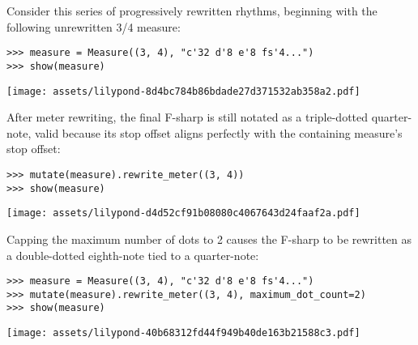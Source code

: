 Consider this series of progressively rewritten rhythms, beginning with the
following unrewritten 3/4 measure:

\begin{comment}
<abjad>
measure = Measure((3, 4), "c'32 d'8 e'8 fs'4...")
show(measure)
</abjad>
\end{comment}

\begin{singlespacing}
\vspace{-0.5\baselineskip}
\begin{lstlisting}
>>> measure = Measure((3, 4), "c'32 d'8 e'8 fs'4...")
>>> show(measure)
\end{lstlisting}
\noindent\texttt{[image: assets/lilypond-8d4bc784b86bdade27d371532ab358a2.pdf]}
\end{singlespacing}

\noindent After meter rewriting, the final F-sharp is still notated as a
triple-dotted quarter-note, valid because its stop offset aligns perfectly with
the containing measure's stop offset:

\begin{comment}
<abjad>
mutate(measure).rewrite_meter((3, 4))
show(measure)
</abjad>
\end{comment}

\begin{singlespacing}
\vspace{-0.5\baselineskip}
\begin{lstlisting}
>>> mutate(measure).rewrite_meter((3, 4))
>>> show(measure)
\end{lstlisting}
\noindent\texttt{[image: assets/lilypond-d4d52cf91b08080c4067643d24faaf2a.pdf]}
\end{singlespacing}

\noindent Capping the maximum number of dots to 2 causes the F-sharp to be
rewritten as a double-dotted eighth-note tied to a quarter-note:

\begin{comment}
<abjad>
measure = Measure((3, 4), "c'32 d'8 e'8 fs'4...")
mutate(measure).rewrite_meter((3, 4), maximum_dot_count=2)
show(measure)
</abjad>
\end{comment}

\begin{singlespacing}
\vspace{-0.5\baselineskip}
\begin{lstlisting}
>>> measure = Measure((3, 4), "c'32 d'8 e'8 fs'4...")
>>> mutate(measure).rewrite_meter((3, 4), maximum_dot_count=2)
>>> show(measure)
\end{lstlisting}
\noindent\texttt{[image: assets/lilypond-40b68312fd44f949b40de163b21588c3.pdf]}
\end{singlespacing}

